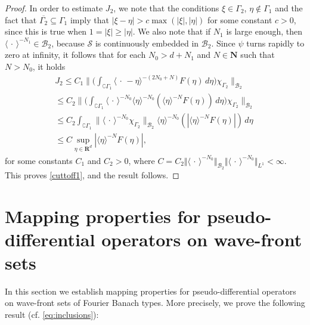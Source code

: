 \documentclass[12pt,a4paper,reqno]{amsart}
\numberwithin{equation}{section}
\numberwithin{thm}{section}
\theoremstyle{definition}
\theoremstyle{remark}
\begin{document}
\begin{proof}
\par

In order to estimate $J_2$, we note that the conditions $\xi \in
\Gamma _2$, $\eta \notin \Gamma _1$ and the fact that $\overline
{\Gamma _2}\subseteq \Gamma _1$ imply that  $|\xi -\eta |>c\max
(|\xi|,|\eta |)$ for some constant $c>0$, since this is true when
$1=|\xi |\ge |\eta|$. We also note that if $N_1$ is large enough, then
${\langle {\, \cdot \, }\rangle} ^{-N_1}\in \mathscr B_2$, because $\mathscr S$ is
continuously embedded in $\mathscr B_2$. Since $\psi$ turns rapidly to
zero at infinity, it follows that for each $N_0> d+N_1$ and $N\in
\mathbf N$ such that $N > N_0$, it holds
\begin{multline}\label{J2comp}
J_2
\leq
C_1\Big \| \Big (\int_{\complement\Gamma _1}{\langle {{\, \cdot \, } -
\eta}\rangle}^{-(2N_0+N)} F(\eta)\, d\eta \Big )\chi_{\Gamma_2}\Big \|
_{\mathscr{B}_2}
\\[1ex]
\leq
C_2\Big \| \Big (\int_{\complement \Gamma_1} {\langle {\, \cdot \, }\rangle}^{-N_0} {\langle \eta\rangle} ^{-N_0}({\langle \eta\rangle}^{-N}F(\eta ))\, d\eta \Big
)\chi_{\Gamma_2}\Big \| _{\mathscr{B}_2}
\\[1ex]
\leq
C_2\int_{\complement \Gamma_1}\|{\langle {\, \cdot \, }\rangle}
^{-N_0}\chi_{\Gamma_2}\|_{\mathscr{B}_2} {\langle \eta\rangle} ^{-N_0}(|{\langle \eta\rangle}
^{-N}F(\eta )|)\, d\eta
\\[1ex]
\leq
 C \sup_{\eta \in {\mathbf R^{{d}}}}|{\langle \eta\rangle}^{-N}F(\eta )|,
\end{multline}
for some constants $C_1$ and $C_2 > 0$, where $C=C_2{\Vert {{\langle {\, \cdot \, }\rangle}
^{-{N_0}}}\Vert _{{\mathscr B _2}}}{\Vert {{\langle {\, \cdot \, }\rangle} ^{-{N_0}}}\Vert _{{L^1}}}<\infty$. This
proves \eqref{cuttoff1}, and the result follows.
\end{proof}

\par

\section{Mapping properties for pseudo-differential
operators on wave-front sets}\label{sec4}

\par

In this section we establish mapping properties for
pseudo-differential operators on wave-front sets of Fourier Banach
types. More precisely, we prove the following result (cf. \eqref{eq:inclusions}):
\end{document}
